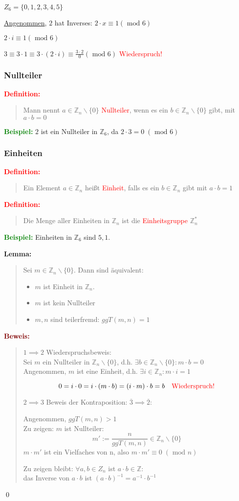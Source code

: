 \documentclass{article}
\newcommand{\red}[1]{\textcolor{red}{#1}}
\newcommand{\green}[1]{\textcolor{green}{#1}}
\newcommand{\dgr}[1]{\textcolor{dgr}{#1}}
\newcommand{\maroon}[1]{\textcolor{maroon}{#1}}
\newcommand{\ex}{\green{\textbf{Beispiel: }}}
\newcommand{\de}[1]{\red{\textbf{Definition: }}\begin{quote}#1\end{quote}}
\newcommand{\lem}[1]{\dgr{\textbf{Lemma: }}\begin{quote}#1\end{quote}}
\newcommand{\pr}[1]{\maroon{\textbf{Beweis: }}\begin{quote}#1\end{quote}\qed}
\newcommand{\n}[1]{\overline{#1}}
\newcommand{\Z}{\mathbb{Z}}
\renewcommand{\mod}{\text{ mod }}
\begin{document}
$Z_6 = \{0,1,2,3,4,5\}$

\underline{Angenommen}, $2$ hat Inverses: $2 \cdot x \equiv 1 (\mod 6)$

$2 \cdot i \equiv 1 (\mod 6)$

$3 \equiv 3 \cdot 1 \equiv 3 \cdot (2 \cdot i) \equiv \frac{3 \cdot 2}{0} (\mod 6)$ \red{Wiederspruch!}

\subsubsection{Nullteiler}
\de{
    Mann nennt $a \in \Z_n \backslash \{0\}$ \red{Nullteiler}, wenn es ein $b \in \Z_n \backslash \{0\}$ gibt, mit $a \cdot b = 0$
}
\ex $2$ ist ein Nullteiler in $\Z_6$, da $2 \cdot 3 = 0 \; (\mod 6)$

\subsubsection{Einheiten}
\de{Ein Element $a \in \Z_n$ heißt \red{Einheit}, falls es ein $b \in \Z_n$ gibt mit $a \cdot b = 1$}

\de{
    Die Menge aller Einheiten in $\Z_n$ ist die \red{Einheitsgruppe} $\Z_n^*$
}

\ex Einheiten in $\Z_6$ sind $5, 1$.

\lem{
    Sei $m \in \Z_n \backslash \{0\}$.
    Dann sind äquivalent:
    \begin{itemize}
        \item $m$ ist Einheit in $\Z_n$.
        \item $m$ ist kein Nullteiler
        \item $m,n$ sind teilerfremd: $ggT(m,n) = 1$
    \end{itemize}
}
\pr{
    $1 \implies 2$ Wiederspruchsbeweis:\\
    Sei $m$ ein Nullteiler in $\Z_n \backslash \{0\}$, d.h. $\exists b \in \Z_n \backslash \{0\}: m \cdot b = 0$\\
    Angenommen, $m$ ist eine Einheit, d.h. $\exists i \in \Z_n: m \cdot i = 1$

    \[
        0 = i \cdot 0 = i \cdot (m \cdot b) = (i \cdot m) \cdot b = b \text{\red{\quad Wiederspruch!}}
    \]

    $2 \implies 3$ Beweis der Kontraposition: $\n{3} \implies \n{2}$:

    Angenommen, $ggT(m,n) > 1$\\
    Zu zeigen: $m$ ist Nullteiler:
    \[
        m' := \frac{n}{ggT(m,n)} \in \Z_n \backslash \{0\}
    \]
    $m \cdot m'$ ist ein Vielfaches von n, also $m \cdot m' \equiv 0 \; (\mod n)$

    Zu zeigen bleibt: $\forall a,b \in Z_n$ ist $a \cdot b \in \Z$:\\
    das Inverse von $a \cdot b$ ist $(a \cdot b)^{-1} = a^{-1} \cdot b^{-1}$
}
\end{document}
